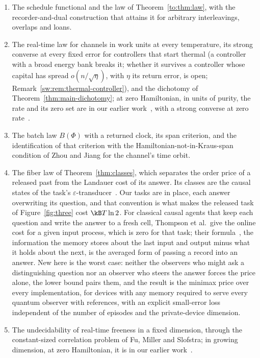 \begin{enumerate}[label=(\arabic*),leftmargin=*,itemsep=1pt,topsep=2pt]
\item The schedule functional and the law of Theorem~\ref{to:thm:law}, with the recorder-and-dual construction that attains it for arbitrary interleavings, overlaps and loans.
\item The real-time law for channels in work units at every temperature, its strong converse at every fixed error for controllers that start thermal (a controller with a broad energy bank breaks it; whether it survives a controller whose capital has spread $o(n/\sqrt\eta)$, with $\eta$ its return error, is open; Remark~\ref{sw:rem:thermal-controller}), and the dichotomy of Theorem~\ref{thm:main-dichotomy}; at zero Hamiltonian, in units of purity, the rate and its zero set are in our earlier work~\cite{Memory,ImmediateDelivery,Douglas26closed}, with a strong converse at zero rate~\cite{Flagship}.
\item The batch law $B(\Phi)$ with a returned clock, its span criterion, and the identification of that criterion with the Hamiltonian-not-in-Kraus-span condition of Zhou and Jiang for the channel's time orbit.
\item The fiber law of Theorem~\ref{thm:classes}, which separates the order price of a released past from the Landauer cost of its answer. Its classes are the causal states of the task's $\varepsilon$-transducer~\cite{BarnettCrutchfield15}. Our tasks are in place, each answer overwriting its question, and that convention is what makes the released task of Figure~\ref{fig:three} cost $\kB T\ln2$. For classical causal agents that keep each question and write the answer to a fresh cell, Thompson et al.\ give the online cost for a given input process, which is zero for that task; their formula~\cite[Eq.~(3)]{Thompson25}, the information the memory stores about the last input and output minus what it holds about the next, is the averaged form of passing a record into an answer. New here is the worst case: neither the observers who might ask a distinguishing question nor an observer who steers the answer forces the price alone, the lower bound pairs them, and the result is the minimax price over every implementation, for devices with any memory required to serve every quantum observer with references, with an explicit small-error loss independent of the number of episodes and the private-device dimension.
\item The undecidability of real-time freeness in a fixed dimension, through the constant-sized correlation problem of Fu, Miller and Slofstra; in growing dimension, at zero Hamiltonian, it is in our earlier work~\cite{Flagship}.

\end{enumerate}
